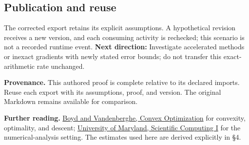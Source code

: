 \documentclass[preprint,12pt,aps,pra,showkeys,amsmath,amssymb,superscriptaddress,floatfix]{revtex4-2}
\theoremstyle{definition}
\theoremstyle{remark}
\begin{document}
\subsection{Publication and reuse}
The corrected export retains its explicit assumptions. A hypothetical
revision receives a new version, and each consuming activity is
rechecked; this scenario is not a recorded runtime event. \textbf{Next
direction:} Investigate accelerated methods or inexact gradients with
newly stated error bounds; do not transfer this exact-arithmetic rate
unchanged.

\par\medskip\begingroup\small\linespread{1.0}\selectfont\noindent\textbf{Provenance.} This authored proof is complete relative to its declared imports. Reuse
each export with its assumptions, proof, and version. The original
Markdown remains available for comparison.
\par\endgroup

\par\smallskip\begingroup\small\linespread{1.0}\selectfont\noindent\textbf{Further reading.} \href{https://web.stanford.edu/~boyd/cvxbook/}{Boyd and Vandenberghe,
Convex Optimization} for convexity, optimality, and descent;
\href{https://www.math.umd.edu/~mariakc/Spring2020Class.html}{University
of Maryland, Scientific Computing I} for the numerical-analysis setting.
The estimates used here are derived explicitly in §4.\par\endgroup
\end{document}
